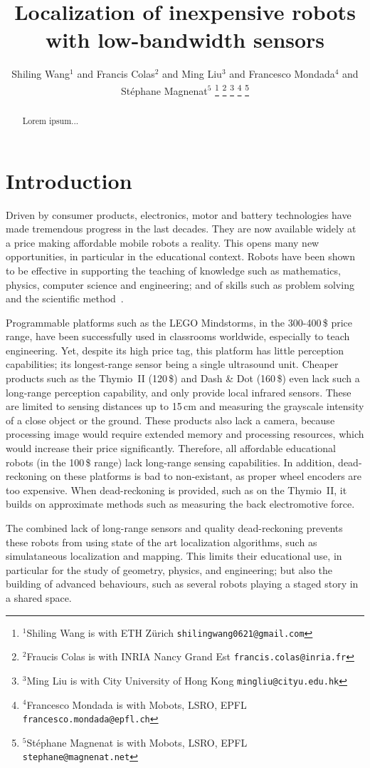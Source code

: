 \documentclass[letterpaper, 10pt, conference]{ieeeconf}
\title{\LARGE \bf
Localization of inexpensive robots with low-bandwidth sensors
}
\author{Shiling Wang$^{1}$ and Francis Colas$^{2}$ and Ming Liu$^{3}$ and Francesco Mondada$^{4}$ and Stéphane Magnenat$^{5}$%
\thanks{$^{1}$Shiling Wang is with ETH Zürich
        {\tt\small shilingwang0621@gmail.com}}%
\thanks{$^{2}$Fraucis Colas is with INRIA Nancy Grand Est
        {\tt\small francis.colas@inria.fr}}%
\thanks{$^{3}$Ming Liu is with City University of Hong Kong
        {\tt\small mingliu@cityu.edu.hk}}%
\thanks{$^{4}$Francesco Mondada is with Mobots, LSRO, EPFL
        {\tt\small francesco.mondada@epfl.ch}}%
\thanks{$^{5}$Stéphane Magnenat is with Mobots, LSRO, EPFL
        {\tt\small stephane@magnenat.net}}%
}
\begin{document}
\maketitle
\thispagestyle{empty}
\pagestyle{empty}

\begin{abstract}
Lorem ipsum...
\end{abstract}

\section{Introduction}

Driven by consumer products, electronics, motor and battery technologies have made tremendous progress in the last decades.
They are now available widely at a price making affordable mobile robots a reality.
This opens many new opportunities, in particular in the educational context.
Robots have been shown to be effective in supporting the teaching of knowledge such as mathematics, physics, computer science and engineering; and of skills such as problem solving and the scientific method~\cite{benitti2012explorin}.

Programmable platforms such as the LEGO Mindstorms, in the 300-400\,\$ price range, have been successfully used in classrooms worldwide, especially to teach engineering.
Yet, despite its high price tag, this platform has little perception capabilities; its longest-range sensor being a single ultrasound unit.
Cheaper products such as the Thymio~II (120\,\$) and Dash \& Dot (160\,\$) even lack such a long-range perception capability, and only provide local infrared sensors.
These are limited to sensing distances up to 15\,cm and measuring the grayscale intensity of a close object or the ground.
These products also lack a camera, because processing image would require extended memory and processing resources, which would increase their price significantly.
Therefore, all affordable educational robots (in the 100\,\$ range) lack long-range sensing capabilities.
In addition, dead-reckoning on these platforms is bad to non-existant, as proper wheel encoders are too expensive.
When dead-reckoning is provided, such as on the Thymio~II, it builds on approximate methods such as measuring the back electromotive force.

The combined lack of long-range sensors and quality dead-reckoning prevents these robots from using state of the art localization algorithms, such as simulataneous localization and mapping.
This limits their educational use, in particular for the study of geometry, physics, and engineering; but also the building of advanced behaviours, such as several robots playing a staged story in a shared space.
\end{document}
